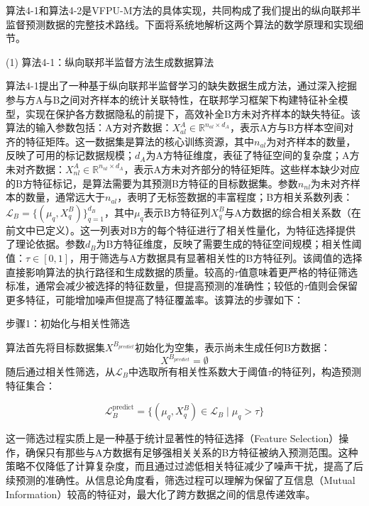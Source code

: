 算法4-1和算法4-2是VFPU-M方法的具体实现，共同构成了我们提出的纵向联邦半监督预测数据的完整技术路线。下面将系统地解析这两个算法的数学原理和实现细节。

(1) 算法4-1：纵向联邦半监督方法生成数据算法

算法4-1提出了一种基于纵向联邦半监督学习的缺失数据生成方法，通过深入挖掘参与方A与B之间对齐样本的统计关联特性，在联邦学习框架下构建特征补全模型，实现在保护各方数据隐私的前提下，高效补全B方未对齐样本的缺失特征。该算法的输入参数包括：A方对齐数据：$X_{al}^A \in \mathbb{R}^{n_{al} \times d_A}$，表示A方与B方样本空间对齐的特征矩阵。这一数据集是算法的核心训练资源，其中$n_{al}$为对齐样本的数量，反映了可用的标记数据规模；$d_A$为A方特征维度，表征了特征空间的复杂度；A方未对齐数据：$X_{nl}^A \in \mathbb{R}^{n_{nl} \times d_A}$，表示A方未对齐部分的特征矩阵。这些样本缺少对应的B方特征标记，是算法需要为其预测B方特征的目标数据集。参数$n_{nl}$为未对齐样本的数量，通常远大于$n_{al}$，表明了无标签数据的丰富程度；B方相关系数列表：$\mathcal{L}_B = \{(\mu_q, X^B_q)\}_{q=1}^{d_B}$，其中$\mu_q$表示B方特征列$X^B_q$与A方数据的综合相关系数（在前文中已定义）。这一列表对B方的每个特征进行了相关性量化，为特征选择提供了理论依据。参数$d_B$为B方特征维度，反映了需要生成的特征空间规模；相关性阈值：$\tau \in [0, 1]$，用于筛选与A方数据具有显著相关性的B方特征列。该阈值的选择直接影响算法的执行路径和生成数据的质量。较高的$\tau$值意味着更严格的特征筛选标准，通常会减少被选择的特征数量，但提高预测的准确性；较低的$\tau$值则会保留更多特征，可能增加噪声但提高了特征覆盖率。该算法的步骤如下：

步骤1：初始化与相关性筛选

算法首先将目标数据集$X^{B_{predict}}$初始化为空集，表示尚未生成任何B方数据：
\begin{equation}
	X^{B_{predict}} = \emptyset
\end{equation}
随后通过相关性筛选，从$\mathcal{L}_B$中选取所有相关性系数大于阈值$\tau$的特征列，构造预测特征集合：

\begin{equation}
	\mathcal{L}_B^{\text{predict}} = \{(\mu_q, X^B_q) \in \mathcal{L}_B \mid \mu_q > \tau\}
\end{equation}

这一筛选过程实质上是一种基于统计显著性的特征选择（Feature Selection）操作，确保只有那些与A方数据有足够强相关关系的B方特征被纳入预测范围。这种策略不仅降低了计算复杂度，而且通过过滤低相关特征减少了噪声干扰，提高了后续预测的准确性。从信息论角度看，筛选过程可以理解为保留了互信息（Mutual Information）较高的特征对，最大化了跨方数据之间的信息传递效率。

